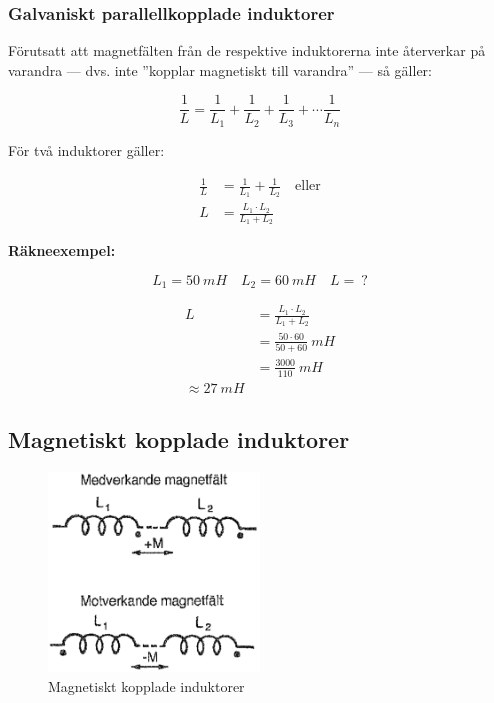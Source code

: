 \subsubsection{Galvaniskt parallellkopplade induktorer}

Förutsatt att magnetfälten från de respektive induktorerna inte återverkar på
varandra --- dvs. inte ''kopplar magnetiskt till varandra'' --- så gäller:

\[
\frac{1}{L} = \frac{1}{L_1} + \frac{1}{L_2} + \frac{1}{L_3} +
\cdots \frac{1}{L_n}
\]

För två induktorer gäller:

\begin{align*}
  \frac{1}{L} &= \frac{1}{L_1} + \frac{1}{L_2} \quad \text{eller} \\
  L &= \frac{L_1 \cdot L_2}{L_1 + L_2}
\end{align*}

\textbf{Räkneexempel:}

\[L_1 = 50\ mH \quad L_2 = 60\ mH \quad L =\ ?\]

\begin{align*}
  L &= \frac{L_1 \cdot L_2}{L_1 + L_2} \\
    &= \frac{50 \cdot 60}{50 + 60}\ mH \\
    &= \frac{3000}{110}\ mH \\
  \approx 27\ mH
\end{align*}

\subsection{Magnetiskt kopplade induktorer}


\begin{figure}
\includegraphics[width=0.5\textwidth]{images/cropped_pdfs/bild_2_3-07.pdf}
\caption{Magnetiskt kopplade induktorer}
\label{fig:BildII3-07}
\end{figure}

